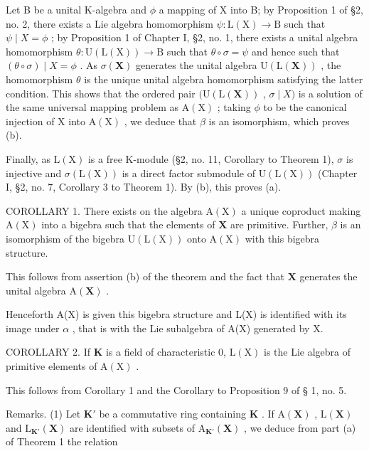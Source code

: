 Let B be a unital K-algebra and \(\phi\) a mapping of X into B; by Proposition 1 of §2, no. 2, there exists a Lie algebra homomorphism \(\psi\colon\mathrm{L}(\mathrm{X})\to\mathrm{B}\) such that \(\psi\mid X=\phi\) ; by Proposition 1 of Chapter I, §2, no. 1, there exists a unital algebra homomorphism \(\theta\colon\mathrm{U}(\mathrm{L}(\mathrm{X}))\to\mathrm{B}\) such that \(\theta\circ\sigma=\psi\) and hence such that \((\theta\circ\sigma)\mid X=\phi\) . As \(\sigma(\mathbf{X})\) generates the unital algebra \(\mathrm{U}(\mathrm{L}(\mathbf{X}))\) , the homomorphism \(\theta\) is the unique unital algebra homomorphism satisfying the latter condition. This shows that the ordered pair \((\mathrm{U}(\mathrm{L}(\mathbf{X}))\) , \(\sigma\mid X)\) is a solution of the same universal mapping problem as \(\mathrm{A}(\mathrm{X})\) ; taking \(\phi\) to be the canonical injection of X into \(\mathrm{A}(\mathrm{X})\) , we deduce that \(\beta\) is an isomorphism, which proves (b).

Finally, as \(\mathrm{L}(\mathrm{X})\) is a free K-module (§2, no. 11, Corollary to Theorem 1), \(\sigma\) is injective and \(\sigma(\mathrm{L}(\mathrm{X}))\) is a direct factor submodule of \(\mathrm{U}(\mathrm{L}(\mathrm{X}))\) (Chapter I, §2, no. 7, Corollary 3 to Theorem 1). By (b), this proves (a).

COROLLARY 1. There exists on the algebra \(\mathrm{A}(\mathrm{X})\) a unique coproduct making \(\mathrm{A}(\mathrm{X})\) into a bigebra such that the elements of \(\mathbf{X}\) are primitive. Further, \(\beta\) is an isomorphism of the bigebra \(\mathrm{U}(\mathrm{L}(\mathrm{X}))\) onto \(\mathrm{A}(\mathrm{X})\) with this bigebra structure.

This follows from assertion (b) of the theorem and the fact that \(\mathbf{X}\) generates the unital algebra \(\mathrm{A}(\mathbf{X})\) .

Henceforth A(X) is given this bigebra structure and L(X) is identified with its image under \(\alpha\) , that is with the Lie subalgebra of A(X) generated by X.

COROLLARY 2. If \(\mathbf{K}\) is a field of characteristic 0, \(\mathrm{L}(\mathrm{X})\) is the Lie algebra of primitive elements of \(\mathrm{A}(\mathrm{X})\) .

This follows from Corollary 1 and the Corollary to Proposition 9 of § 1, no. 5.

Remarks. (1) Let \(\mathbf{K}'\) be a commutative ring containing \(\mathbf{K}\) . If \(\mathrm{A}(\mathbf{X})\) , \(\mathrm{L}(\mathbf{X})\) and \(\mathrm{L}_{\mathbf{K}'}(\mathbf{X})\) are identified with subsets of \(\mathrm{A}_{\mathbf{K}'}(\mathbf{X})\) , we deduce from part (a) of Theorem 1 the relation

